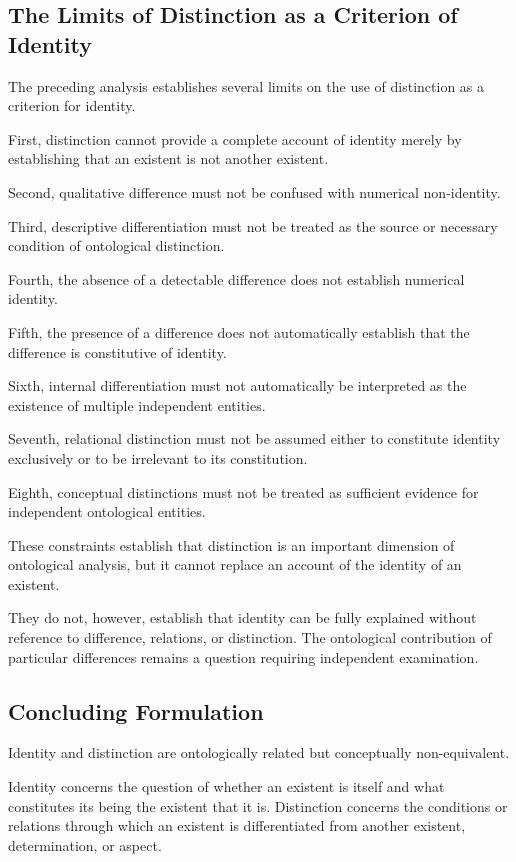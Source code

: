 \subsection{The Limits of Distinction as a Criterion of Identity}

The preceding analysis establishes several
limits on the use of distinction as a criterion
for identity.

First, distinction cannot provide a complete
account of identity merely by establishing
that an existent is not another existent.

Second, qualitative difference must not be
confused with numerical non-identity.

Third, descriptive differentiation must not
be treated as the source or necessary condition
of ontological distinction.

Fourth, the absence of a detectable difference
does not establish numerical identity.

Fifth, the presence of a difference does not
automatically establish that the difference
is constitutive of identity.

Sixth, internal differentiation must not
automatically be interpreted as the existence
of multiple independent entities.

Seventh, relational distinction must not
be assumed either to constitute identity
exclusively or to be irrelevant to its
constitution.

Eighth, conceptual distinctions must not
be treated as sufficient evidence for
independent ontological entities.

These constraints establish that distinction
is an important dimension of ontological
analysis, but it cannot replace an account
of the identity of an existent.

They do not, however, establish that identity
can be fully explained without reference to
difference, relations, or distinction. The
ontological contribution of particular
differences remains a question requiring
independent examination.

\subsection{Concluding Formulation}

Identity and distinction are ontologically
related but conceptually non-equivalent.

Identity concerns the question of whether
an existent is itself and what constitutes
its being the existent that it is. Distinction
concerns the conditions or relations through
which an existent is differentiated from
another existent, determination, or aspect.

